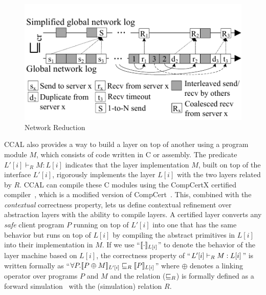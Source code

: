 \begin{figure}
\begin{center}
\includegraphics[scale=0.47]{figs/multipaxos/network_reduction.pdf}
\end{center}
\caption{Network Reduction}
\label{fig:network-reduction}
\end{figure}

CCAL also provides a way to build a layer on top of another using a program module $M$, which consists of code written in C or assembly.
The predicate $L'[i] \vdash_R  M : L[i]$ indicates that the layer implementation $M$, built on top of the interface $L'[i]$, rigorously implements
the layer $L[i]$ with the two layers related by $R$.
CCAL can compile these C modules using the CompCertX certified compiler~\cite{deepspec, concurrency},
which is a modified version of CompCert~\cite{compcert}.
This, combined with the {\em contextual} correctness property,
lets us define contextual refinement over abstraction layers with the ability to compile layers.
A certified layer converts any {\em safe} client program $P$ running on top of $L'[i]$ into one that has the
same behavior but runs on top of $L[i]$ by compiling the abstract
primitives in $L[i]$ into their implementation in $M$.
If we use ``$\sem{L[i]}{\cdot}$'' to denote the behavior of the layer machine based on
$L[i]$, the correctness property of ``$\ltyp{L'[i]}{R}{M}{L[i]}$'' is written
formally as ``$\forall{}P.\sem{L'[i]}{P\oplus{}M} \refines_R \sem{L[i]}{P}$''
where $\oplus$ denotes a linking operator over programs $P$ and $M$ and 
the relation ($\refines_R$) is formally defined as a forward
simulation~\cite{Lynch95,leroy09,Milner71,Park81} with the (simulation) relation $R$.


